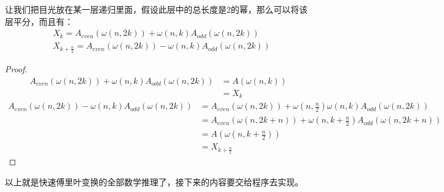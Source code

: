         让我们把目光放在某一层递归里面，假设此层中的总长度是2的幂，那么可以将该层平分，而且有：
        \begin{equation}
            \begin{split}
                &X_k = A_{even}(\omega(n, 2k)) + \omega(n, k)A_{odd}(\omega(n, 2k))\\
                &X_{k + \frac n 2} = A_{even}(\omega(n, 2k)) - \omega(n, k)A_{odd}(\omega(n, 2k))
            \end{split}
            \label{eq: 4.12}
        \end{equation}
        \begin{proof}
            \begin{equation*}
                \begin{split}
                    A_{even}(\omega(n, 2k)) + \omega(n, k)A_{odd}(\omega(n, 2k)) &= A(\omega(n, k))\\
                    &= X_k
                \end{split}
            \end{equation*}
            \begin{equation*}
                \begin{split}
                    A_{even}(\omega(n, 2k)) - \omega(n, k)A_{odd}(\omega(n, 2k)) &= A_{even}(\omega(n, 2k)) + \omega(n, \frac n 2) \omega(n, k)A_{odd}(\omega(n, 2k))\\
                    &= A_{even}(\omega(n, 2k + n)) + \omega(n, k + \frac n 2)A_{odd}(\omega(n, 2k + n))\\
                    &= A(\omega(n, k + \frac n 2))\\
                    &= X_{k + \frac n 2}
                \end{split}
            \end{equation*}
        \end{proof}
        以上就是快速傅里叶变换的全部数学推理了，接下来的内容要交给程序去实现。